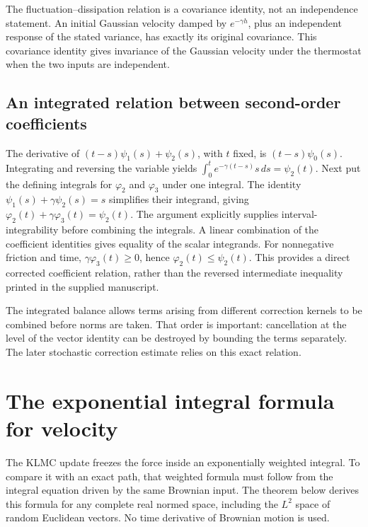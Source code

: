 \documentclass[11pt,a4paper]{report}
\begin{document}
The fluctuation–dissipation relation is a covariance identity, not an independence statement. An initial Gaussian velocity damped by \(e^{-\gamma h}\), plus an independent response of the stated variance, has exactly its original covariance. This covariance identity gives invariance of the Gaussian velocity under the thermostat when the two inputs are independent.

\subsection{\texorpdfstring{An integrated relation between second-order coefficients}{An integrated relation between second-order coefficients}}
\label{report-step-KineticLangevin-Coefficients-lean-14}


The derivative of \((t-s)\psi_1(s)+\psi_2(s)\), with \(t\) fixed, is \((t-s)\psi_0(s)\). Integrating and reversing the variable yields \(\int_0^te^{-\gamma(t-s)}s\,ds=\psi_2(t)\). Next put the defining integrals for \(\varphi_2\) and \(\varphi_3\) under one integral. The identity \(\psi_1(s)+\gamma\psi_2(s)=s\) simplifies their integrand, giving \(\varphi_2(t)+\gamma\varphi_3(t)=\psi_2(t)\). The argument explicitly supplies interval-integrability before combining the integrals. A linear combination of the coefficient identities gives equality of the scalar integrands. For nonnegative friction and time, \(\gamma\varphi_3(t)\ge0\), hence \(\varphi_2(t)\le\psi_2(t)\). This provides a direct corrected coefficient relation, rather than the reversed intermediate inequality printed in the supplied manuscript.



The integrated balance allows terms arising from different correction kernels to be combined before norms are taken. That order is important: cancellation at the level of the vector identity can be destroyed by bounding the terms separately. The later stochastic correction estimate relies on this exact relation.

\section{\texorpdfstring{The exponential integral formula for velocity}{The exponential integral formula for velocity}}
\label{proof-module-KineticLangevin-MildEquation-lean}


The KLMC update freezes the force inside an exponentially weighted integral. To compare it with an exact path, that weighted formula must follow from the integral equation driven by the same Brownian input. The theorem below derives this formula for any complete real normed space, including the \(L^{2}\) space of random Euclidean vectors. No time derivative of Brownian motion is used.
\end{document}
